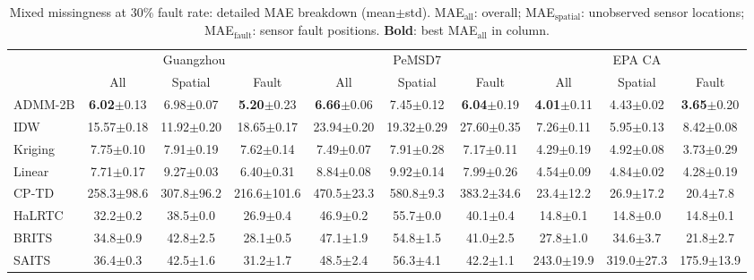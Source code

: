 \documentclass[journal]{IEEEtran}
\begin{document}
\begin{table}[htbp]
  \centering
  \caption{Mixed missingness at 30\% fault rate: detailed MAE breakdown (mean$\pm$std). MAE$_{\text{all}}$: overall; MAE$_{\text{spatial}}$: unobserved sensor locations; MAE$_{\text{fault}}$: sensor fault positions. \textbf{Bold}: best MAE$_{\text{all}}$ in column.}
  \label{tab:detail}
  \small
  \setlength{\tabcolsep}{3pt}
  \begin{tabular}{lccccccccc}
    \toprule
    & \multicolumn{3}{c}{Guangzhou} & \multicolumn{3}{c}{PeMSD7} & \multicolumn{3}{c}{EPA CA} \\
    \cmidrule(lr){2-4} \cmidrule(lr){5-7} \cmidrule(lr){8-10}
    & All & Spatial & Fault & All & Spatial & Fault & All & Spatial & Fault \\
    \midrule
    ADMM-2B & \textbf{6.02}$\pm$0.13 & 6.98$\pm$0.07 & \textbf{5.20}$\pm$0.23 & \textbf{6.66}$\pm$0.06 & 7.45$\pm$0.12 & \textbf{6.04}$\pm$0.19 & \textbf{4.01}$\pm$0.11 & 4.43$\pm$0.02 & \textbf{3.65}$\pm$0.20 \\
    IDW & 15.57$\pm$0.18 & 11.92$\pm$0.20 & 18.65$\pm$0.17 & 23.94$\pm$0.20 & 19.32$\pm$0.29 & 27.60$\pm$0.35 & 7.26$\pm$0.11 & 5.95$\pm$0.13 & 8.42$\pm$0.08 \\
    Kriging & 7.75$\pm$0.10 & 7.91$\pm$0.19 & 7.62$\pm$0.14 & 7.49$\pm$0.07 & 7.91$\pm$0.28 & 7.17$\pm$0.11 & 4.29$\pm$0.19 & 4.92$\pm$0.08 & 3.73$\pm$0.29 \\
    \midrule
    Linear & 7.71$\pm$0.17 & 9.27$\pm$0.03 & 6.40$\pm$0.31 & 8.84$\pm$0.08 & 9.92$\pm$0.14 & 7.99$\pm$0.26 & 4.54$\pm$0.09 & 4.84$\pm$0.02 & 4.28$\pm$0.19 \\
    CP-TD & 258.3$\pm$98.6 & 307.8$\pm$96.2 & 216.6$\pm$101.6 & 470.5$\pm$23.3 & 580.8$\pm$9.3 & 383.2$\pm$34.6 & 23.4$\pm$12.2 & 26.9$\pm$17.2 & 20.4$\pm$7.8 \\
    HaLRTC & 32.2$\pm$0.2 & 38.5$\pm$0.0 & 26.9$\pm$0.4 & 46.9$\pm$0.2 & 55.7$\pm$0.0 & 40.1$\pm$0.4 & 14.8$\pm$0.1 & 14.8$\pm$0.0 & 14.8$\pm$0.1 \\
    BRITS & 34.8$\pm$0.9 & 42.8$\pm$2.5 & 28.1$\pm$0.5 & 47.1$\pm$1.9 & 54.8$\pm$1.5 & 41.0$\pm$2.5 & 27.8$\pm$1.0 & 34.6$\pm$3.7 & 21.8$\pm$2.7 \\
    SAITS & 36.4$\pm$0.3 & 42.5$\pm$1.6 & 31.2$\pm$1.7 & 48.5$\pm$2.4 & 56.3$\pm$4.1 & 42.2$\pm$1.1 & 243.0$\pm$19.9 & 319.0$\pm$27.3 & 175.9$\pm$13.9 \\
    \bottomrule
  \end{tabular}
\end{table}
\end{document}
